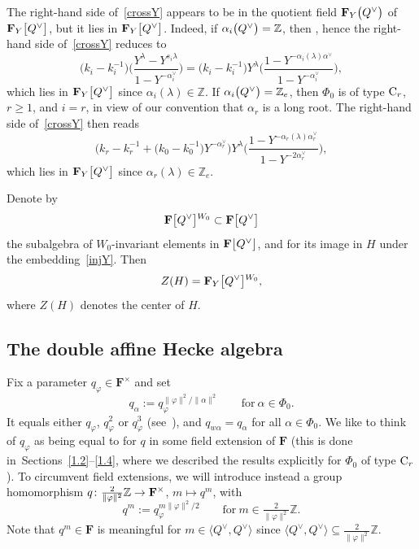 \documentclass[11pt]{article}
\numberwithin{equation}{section}
\numberwithin{equation}{section}
\begin{document}
The right-hand side of~\eqref{crossY} appears to be in the quotient field $\mathbf{F}_Y\smash{\bigl(Q^\vee\bigr)}$ of $\mathbf{F}_Y\smash{\bigl[Q^\vee\bigr]}$, but it lies
in $\mathbf{F}_Y\smash{\bigl[Q^\vee\bigr]}$. Indeed, if $\alpha_i\smash{\bigl(Q^\vee\bigr)}=\mathbb{Z}$, then
, hence the right-hand side of~\eqref{crossY} reduces to
\[
\bigl(k_i-k_i^{-1}\bigr)\biggl(\frac{Y^\lambda-Y^{s_i\lambda}}{1-Y^{-\alpha_i^\vee}}\biggr)=
\bigl(k_i-k_i^{-1}\bigr)Y^\lambda\biggl(\frac{1-Y^{-\alpha_i(\lambda)\alpha^\vee}}{1-Y^{-\alpha_i^\vee}}\biggr),
\]
which lies in $\mathbf{F}_Y\smash{\bigl[Q^\vee\bigr]}$ since $\alpha_i(\lambda)\in\mathbb{Z}$. If $\alpha_i\smash{\bigl(Q^\vee\bigr)}=\mathbb{Z}_e$, then $\Phi_0$ is of type ${\rm C}_r$, $r\geq 1$,
and $i=r$, in view of our convention that $\alpha_r$ is a long root.
The right-hand side of~\eqref{crossY} then reads
\[
\bigl(k_r-k_r^{-1}+\bigl(k_0-k_0^{-1}\bigr)Y^{-\alpha_r^\vee}\bigr)Y^\lambda\biggl(\frac{1-Y^{-\alpha_r(\lambda)\alpha_r^\vee}}{1-Y^{-2\alpha_r^\vee}}\biggr),
\]
which lies in $\mathbf{F}_Y\smash{\bigl[Q^\vee\bigr]}$ since $\alpha_r(\lambda)\in \mathbb{Z}_e$.

Denote by
\[
\mathbf{F}\smash{\bigl[Q^\vee\bigr]}^{W_0}\subset\mathbf{F}\smash{\bigl[Q^\vee\bigr]}
\]
the subalgebra of $W_0$-invariant elements in $\mathbf{F}\smash{\bigl[Q^\vee\bigr]}$, and  for its image in $H$ under the embedding~\eqref{injY}. Then
\[
Z(H)=\mathbf{F}_Y\smash{\bigl[Q^\vee\bigr]}^{W_0},
\]
where $Z(H)$ denotes the center of $H$.

\subsection{The double affine Hecke algebra}\label{2.5}
Fix a parameter $q_\varphi\in\mathbf{F}^\times$ and set
\[
q_\alpha:=q_\varphi^{\|\varphi\|^2/\|\alpha\|^2}\qquad \text{for}\ \alpha\in\Phi_0.
\]
It equals either $q_\varphi$, $q_\varphi^2$ or $q_\varphi^3$ (see~\cite[Section~9.4, Table~1]{Hu}), and $q_{w\alpha}=q_\alpha$ for all $\alpha\in\Phi_0$.
We like to think of $q_\varphi$ as being equal to  for $q$ in some field extension of $\mathbf{F}$ (this is done in~Sections~\ref{1.2}--\ref{1.4}, where we described the results explicitly for $\Phi_0$ of type ${\rm C}_r$).
To circumvent field extensions, we will introduce instead a group homomorphism $q\colon \smash{\frac{2}{\|\varphi\|^2}}\mathbb{Z}\rightarrow\mathbf{F}^\times$, $m\mapsto q^m$, with
\begin{equation*}%
q^{m}:=q_\varphi^{m\|\varphi\|^2/2}\qquad \text{for}\ m\in\tfrac{2}{\|\varphi\|^2}\mathbb{Z}.
\end{equation*}
Note that $q^m\in\mathbf{F}$ is meaningful for $m\in \bigl\langle Q^\vee, Q^\vee\bigr\rangle$ since
$\bigl\langle Q^\vee, Q^\vee\bigr\rangle\subseteq\frac{2}{\|\varphi\|^2}\mathbb{Z}$.
\end{document}
